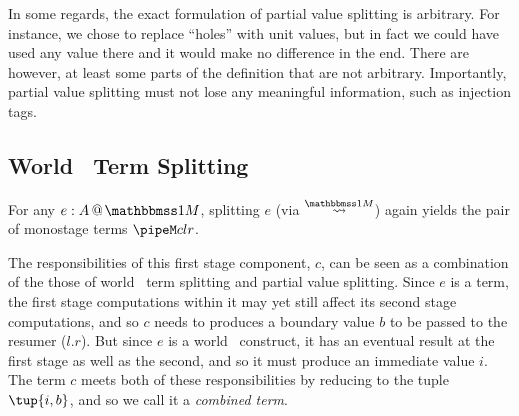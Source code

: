 \begin{abstrsyn}
In some regards, the exact formulation of partial value splitting is arbitrary.
For instance, we chose to replace ``holes'' with unit values,
but in fact we could have used any value there and it would make no difference in the end.
There are however, at least some parts of the definition that are not arbitrary.
Importantly, partial value splitting must not lose any meaningful information,
such as injection tags.





\subsection{World \bbonem\ Term Splitting}

For any $\colmix e A$, 
splitting $e$ (via $\splitonesym$) again 
yields the pair of monostage terms $\pipeM c l r$. 

The responsibilities of this first stage component, $c$, can be seen as a combination of the
those of world \bbtwo\ term splitting and partial value splitting.
Since $e$ is a term, the first stage computations within it may yet still
affect its second stage computations,
and so $c$ needs to produces a boundary value $b$ to be passed to the resumer ($l.r$).
But since $e$ is a world \bbonem\ construct, it has an eventual result at the 
first stage as well as the second, and so it must produce an immediate value $i$.
The term $c$ meets both of these responsibilities by reducing to the tuple $\tup{i,b}$,
and so we call it a {\em combined term}.


\end{abstrsyn}
